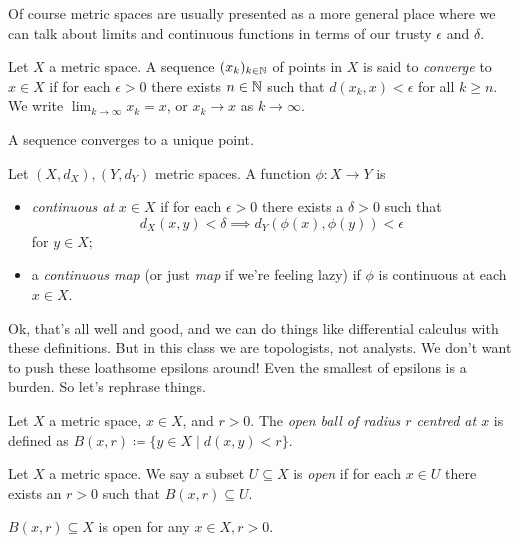 Of course metric spaces are usually presented as a more general place
where we can talk about limits and continuous functions in terms of
our trusty $\epsilon$ and $\delta$.

\begin{definition}
  Let $X$ a metric space. A sequence $(x_k)_{k \in \mathbb{N}}$ of points in
  $X$ is said to \textit{converge} to $x \in X$ if for each $\epsilon
  > 0$ there exists $n \in \mathbb{N}$ such that $d(x_k,x) < \epsilon$ for all
  $k \ge n$. We write $\lim_{k \to \infty} x_k = x$, or $x_k \to x$ as
  $k \to \infty$.
\end{definition}

\begin{exercise}
  A sequence converges to a unique point.
\end{exercise}

\begin{definition}
  Let $(X, d_X), (Y, d_Y)$ metric spaces. A function $\phi : X \to Y$
  is
  \begin{itemize}
  \item \textit{continuous at} $x \in X$ if for each $\epsilon > 0$
    there exists a $\delta > 0$ such that
    \[
    d_X(x,y) < \delta \implies d_Y(\phi(x),\phi(y)) < \epsilon
    \]
    for $y \in X$;
  \item a \textit{continuous map} (or just \textit{map} if we're
    feeling lazy) if $\phi$ is continuous at each $x \in X$.
  \end{itemize}
\end{definition}

Ok, that's all well and good, and we can do things like differential
calculus with these definitions. But in this class we are topologists,
not analysts. We don't want to push these loathsome epsilons around!
Even the smallest of epsilons is a burden. So let's rephrase things.

\begin{definition}
  Let $X$ a metric space, $x \in X$, and $r > 0$. The \textit{open
    ball of radius $r$ centred at $x$} is defined as $B(x,r) \coloneqq
  \{y \in X \mid d(x,y) < r\}$.
\end{definition}

\begin{definition}
  Let $X$ a metric space. We say a subset $U \subseteq X$ is
  \emph{open} if for each $x \in U$ there exists an $r > 0$ such that
  $B(x,r) \subseteq U$.
\end{definition}

\begin{exercise}
  $B(x,r) \subseteq X$ is open for any $x \in X, r > 0$.
\end{exercise}

